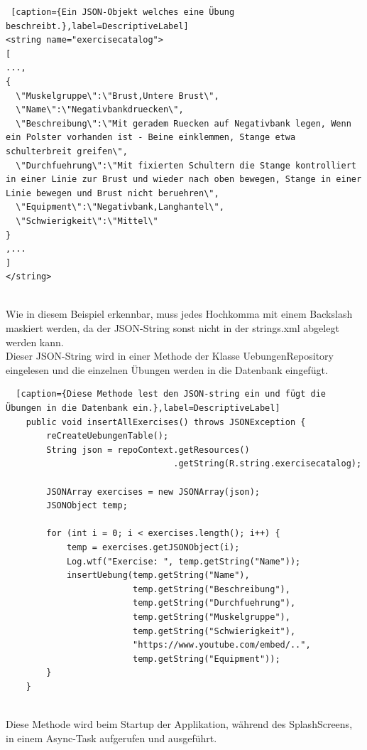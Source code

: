 \documentclass[FIPLY_base.tex]{subfiles}
\begin{document}
\begin{lstlisting} [caption={Ein JSON-Objekt welches eine Übung beschreibt.},label=DescriptiveLabel]
<string name="exercisecatalog">
[
...,
{
  \"Muskelgruppe\":\"Brust,Untere Brust\",
  \"Name\":\"Negativbankdruecken\",
  \"Beschreibung\":\"Mit geradem Ruecken auf Negativbank legen, Wenn ein Polster vorhanden ist - Beine einklemmen, Stange etwa schulterbreit greifen\",
  \"Durchfuehrung\":\"Mit fixierten Schultern die Stange kontrolliert in einer Linie zur Brust und wieder nach oben bewegen, Stange in einer Linie bewegen und Brust nicht beruehren\",
  \"Equipment\":\"Negativbank,Langhantel\",
  \"Schwierigkeit\":\"Mittel\"
}
,...
]
</string>
\end{lstlisting}
\ \\
Wie in diesem Beispiel erkennbar, muss jedes Hochkomma mit einem Backslash maskiert werden, da der JSON-String sonst nicht in der strings.xml abgelegt werden kann.
\newpage
\ \\
Dieser JSON-String wird in einer Methode der Klasse UebungenRepository eingelesen und die einzelnen Übungen werden in die Datenbank eingefügt.
\ \\
\begin{lstlisting}  [caption={Diese Methode lest den JSON-string ein und fügt die Übungen in die Datenbank ein.},label=DescriptiveLabel]
    public void insertAllExercises() throws JSONException {
        reCreateUebungenTable();
        String json = repoContext.getResources()
                                 .getString(R.string.exercisecatalog);

        JSONArray exercises = new JSONArray(json);
        JSONObject temp;

        for (int i = 0; i < exercises.length(); i++) {
            temp = exercises.getJSONObject(i);
            Log.wtf("Exercise: ", temp.getString("Name"));
            insertUebung(temp.getString("Name"), 
                         temp.getString("Beschreibung"),
                         temp.getString("Durchfuehrung"), 
                         temp.getString("Muskelgruppe"), 
                         temp.getString("Schwierigkeit"), 
                         "https://www.youtube.com/embed/..", 
                         temp.getString("Equipment"));
        }
    }
\end{lstlisting}
\ \\
Diese Methode wird beim Startup der Applikation, während des SplashScreens, in einem Async-Task aufgerufen und ausgeführt.
\end{document}

